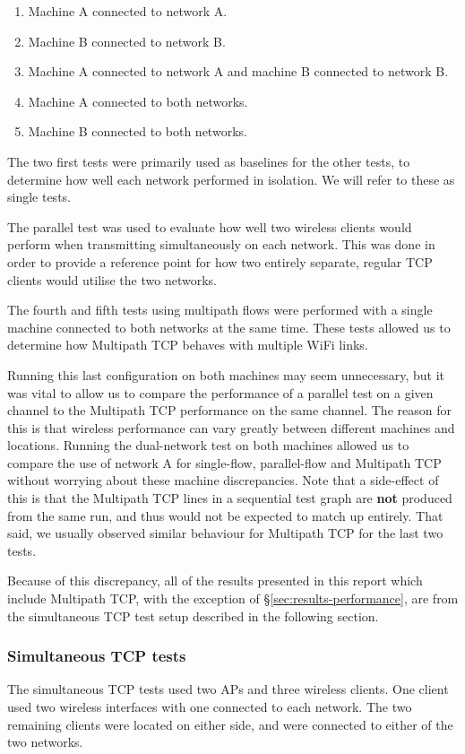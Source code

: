 \begin{enumerate}
  \item Machine A connected to network A.
  \item Machine B connected to network B.
  \item Machine A connected to network A and machine B connected to network B.
  \item Machine A connected to both networks.
  \item Machine B connected to both networks.
\end{enumerate}

The two first tests were primarily used as baselines for the other tests, to
determine how well each network performed in isolation. We will refer to these
as single tests.

The parallel test was used to evaluate how well two wireless clients would
perform when transmitting simultaneously on each network. This was done in order
to provide a reference point for how two entirely separate, regular TCP clients
would utilise the two networks.

The fourth and fifth tests using multipath flows were performed with a single
machine connected to both networks at the same time. These tests allowed us to
determine how Multipath TCP behaves with multiple WiFi links.

Running this last configuration on both machines may seem unnecessary, but it
was vital to allow us to compare the performance of a parallel test on a given
channel to the Multipath TCP performance on the same channel. The reason for
this is that wireless performance can vary greatly between different machines
and locations. Running the dual-network test on both machines allowed us to
compare the use of network A for single-flow, parallel-flow and Multipath TCP
without worrying about these machine discrepancies. Note that a side-effect of
this is that the Multipath TCP lines in a sequential test graph are \textbf{not}
produced from the same run, and thus would not be expected to match up entirely.
That said, we usually observed similar behaviour for Multipath TCP for the last
two tests.

Because of this discrepancy, all of the results presented in this report which
include Multipath TCP, with the exception of \S\ref{sec:results-performance},
are from the simultaneous TCP test setup described in the following section.

\subsubsection{Simultaneous TCP tests}
\label{sec:met:setups:simtcp}
The simultaneous TCP tests used two APs and three wireless clients. One client
used two wireless interfaces with one connected to each network. The two
remaining clients were located on either side, and were connected to either of
the two networks.

